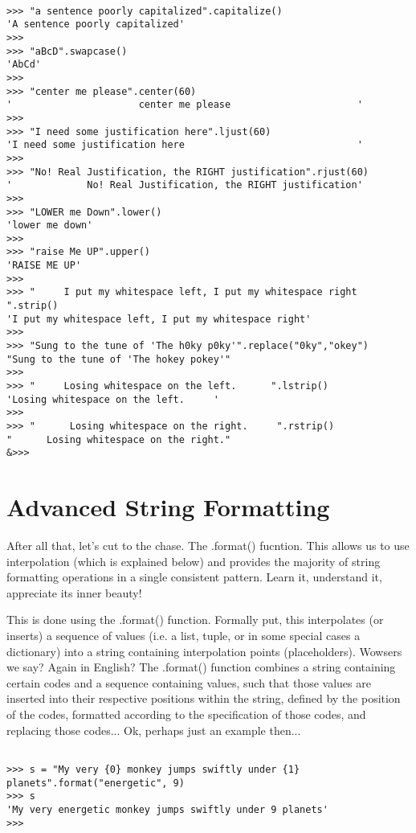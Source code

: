 \begin{lstlisting}

>>> "a sentence poorly capitalized".capitalize()
'A sentence poorly capitalized'
>>>
>>> "aBcD".swapcase()
'AbCd'
>>>
>>> "center me please".center(60)
'                      center me please                      '
>>>
>>> "I need some justification here".ljust(60)
'I need some justification here                              '
>>>
>>> "No! Real Justification, the RIGHT justification".rjust(60)
'             No! Real Justification, the RIGHT justification'
>>>
>>> "LOWER me Down".lower()
'lower me down'
>>>
>>> "raise Me UP".upper()
'RAISE ME UP'
>>>
>>> "     I put my whitespace left, I put my whitespace right     ".strip()
'I put my whitespace left, I put my whitespace right'
>>>
>>> "Sung to the tune of 'The h0ky p0ky'".replace("0ky","okey")
"Sung to the tune of 'The hokey pokey'"
>>>
>>> "     Losing whitespace on the left.      ".lstrip()
'Losing whitespace on the left.     '
>>>
>>> "      Losing whitespace on the right.     ".rstrip()
"      Losing whitespace on the right." 
&>>>
\end{lstlisting}

\section{Advanced String Formatting}

After all that, let's cut to the chase. The .format() fucntion.   This allows us to use interpolation (which is explained below) and provides the majority of string   formatting operations in a single consistent pattern.  Learn it,   understand it, appreciate its inner beauty!

This is done using the .format() function. Formally put, this interpolates (or inserts) a sequence of   values (i.e. a list, tuple, or in some special cases a dictionary) into   a string containing interpolation points (placeholders). Wowsers we   say? Again in English? The .format() function combines a string   containing certain codes and a sequence containing values, such that   those values are inserted into their respective positions within the   string, defined by the position of the codes, formatted according to   the specification of those codes, and replacing those codes... Ok, perhaps just an example   then...
\begin{lstlisting}

>>> s = "My very {0} monkey jumps swiftly under {1} planets".format("energetic", 9)
>>> s
'My very energetic monkey jumps swiftly under 9 planets'
>>>
\end{lstlisting}

